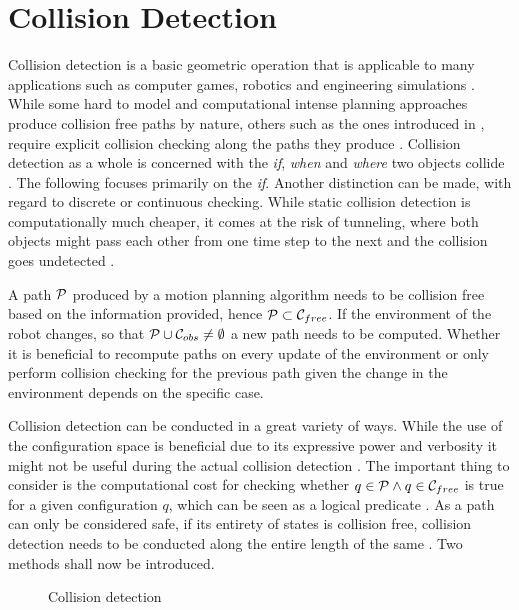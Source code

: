 \chapter{Collision Detection}
Collision detection is a basic geometric operation that is applicable to many applications such as computer games, robotics and engineering simulations \cite{Ericson.2005,Ponamgi.1997,Chazelle.1987}. While some hard to model and computational intense planning approaches produce collision free paths by nature, others such as the ones introduced in , require explicit collision checking along the paths they produce \cite{LaValle.2006}. Collision detection as a whole is concerned with the \emph{if}, \emph{when} and \emph{where} two objects collide \cite{Ericson.2005}. The following focuses primarily on the \emph{if}. Another distinction can be made, with regard to discrete or continuous checking. While static collision detection is computationally much cheaper, it comes at the risk of tunneling, where both objects might pass each other from one time step to the next and the collision goes undetected \cite{Ericson.2005}.

A path $\mathcal{P}$ produced by a motion planning algorithm needs to be collision free based on the information provided, hence $\mathcal{P} \subset \mathcal{C}_{free}$. If the environment of the robot changes, so that $\mathcal{P} \cup \mathcal{C}_{obs} \neq \emptyset$ a new path needs to be computed. Whether it is beneficial to recompute paths on every update of the environment or only perform collision checking for the previous path given the change in the environment depends on the specific case.

Collision detection can be conducted in a great variety of ways. While the use of the configuration space is beneficial due to its expressive power and verbosity it might not be useful during the actual collision detection \cite{LaValle.2006}. The important thing to consider is the computational cost for checking whether $q \in \mathcal{P} \land q \in \mathcal{C}_{free}$ is true for a given configuration $q$, which can be seen as a logical predicate \cite{LaValle.2006}. As a path can only be considered safe, if its entirety of states is collision free, collision detection needs to be conducted along the entire length of the same \cite{LaValle.2006,Ericson.2005}. Two methods shall now be introduced.

\begin{figure}[h]
    \caption{Collision detection}
    \label{fig:collisionDetection}
\end{figure}

